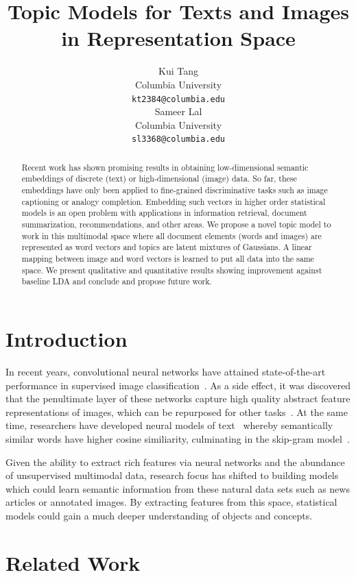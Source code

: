 \documentclass[11pt]{article}
\title{Topic Models for Texts and Images in Representation Space}
\author{Kui Tang \\
  Columbia University \\
  {\tt kt2384@columbia.edu} \\\And
  Sameer Lal \\
  Columbia University \\
  {\tt sl3368@columbia.edu} \\}
\date{}
\begin{document}
\maketitle

\begin{abstract}
Recent work has shown promising results in obtaining low-dimensional semantic embeddings of discrete (text) or high-dimensional (image) data. So far, these embeddings have only been applied to fine-grained discriminative tasks such as image captioning or analogy completion. Embedding such vectors in higher order statistical models is an open problem with applications in information retrieval, document summarization, recommendations, and other areas. We propose a novel topic model to work in this multimodal space where all document elements (words and images) are represented as word vectors and topics are latent mixtures of Gaussians. A linear mapping between image and word vectors is learned to put all data into the same space. We present qualitative and quantitative results showing improvement against baseline LDA and conclude and propose future work.
\end{abstract}

\section{Introduction}
In recent years, convolutional neural networks have attained state-of-the-art performance in supervised image classification~\cite{Krizhevsky12}. As a side effect, it was discovered that the penultimate layer of these networks capture high quality abstract feature representations of images, which can be repurposed for other tasks~\cite{Frome13}. At the same time, researchers have developed neural models of text~\cite{Bengio06} whereby semantically similar words have higher cosine similiarity, culminating in the skip-gram model~\cite{Mikolov13a}.

Given the ability to extract rich features via neural networks and the abundance of unsupervised multimodal data, research focus has shifted to building models which could learn semantic information from these natural data sets such as news articles or annotated images. By extracting features from this space, statistical models could gain a much deeper understanding of objects and concepts. 

\section{Related Work}
\end{document}
